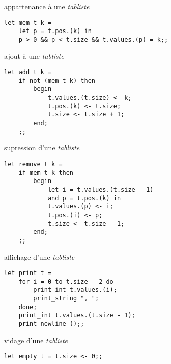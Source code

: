 \begin{fnc*}{appartenance à une \emph{tabliste}}
\begin{verbatim}
let mem t k =
    let p = t.pos.(k) in
    p > 0 && p < t.size && t.values.(p) = k;;
\end{verbatim}
\end{fnc*}
\begin{fnc*}{ajout à une \emph{tabliste}}
\begin{verbatim}
let add t k =
    if not (mem t k) then
        begin
            t.values.(t.size) <- k;
            t.pos.(k) <- t.size;
            t.size <- t.size + 1;
        end;
    ;;
\end{verbatim}
\end{fnc*}
\begin{fnc*}{supression d'une \emph{tabliste}}
\begin{verbatim}
let remove t k =
    if mem t k then
        begin
            let i = t.values.(t.size - 1)
            and p = t.pos.(k) in
            t.values.(p) <- i;
            t.pos.(i) <- p;
            t.size <- t.size - 1;
        end;
    ;;
\end{verbatim}
\end{fnc*}
\begin{fnc*}{affichage d'une \emph{tabliste}}
\begin{verbatim}
let print t =
    for i = 0 to t.size - 2 do
        print_int t.values.(i);
        print_string ", ";
    done;
    print_int t.values.(t.size - 1);
    print_newline ();;
\end{verbatim}
\end{fnc*}
\begin{fnc*}{vidage d'une \emph{tabliste}}
\begin{verbatim}
let empty t = t.size <- 0;;
\end{verbatim}
\end{fnc*}